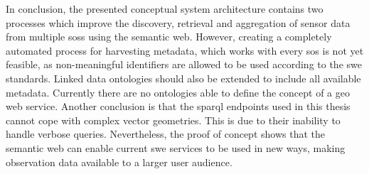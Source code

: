 In conclusion, the presented conceptual system architecture contains two processes which improve the discovery, retrieval and aggregation of sensor data from multiple \aclp*{sos} using the semantic web. However, creating a completely automated process for harvesting metadata, which works with every \acl*{sos} is not yet feasible, as non-meaningful identifiers are allowed to be used according to the \acs*{swe} standards. Linked data ontologies should also be extended to include all available metadata. Currently there are no ontologies able to define the concept of a geo web service. Another conclusion is that the \acs*{sparql} endpoints used in this thesis cannot cope with complex vector geometries. This is due to their inability to handle verbose queries. Nevertheless, the proof of concept shows that the semantic web can enable current \ac{swe} services to be used in new ways, making observation data available to a larger user audience.  